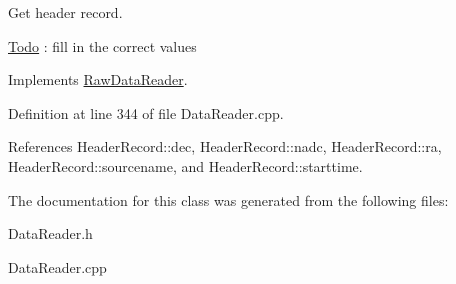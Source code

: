 Get header record. 

\begin{Desc}
\item[\hyperlink{todo__todo000008}{Todo}]: fill in the correct values \end{Desc}


Implements \hyperlink{classRawDataReader}{RawDataReader}.



Definition at line 344 of file DataReader.cpp.



References HeaderRecord::dec, HeaderRecord::nadc, HeaderRecord::ra, HeaderRecord::sourcename, and HeaderRecord::starttime.



The documentation for this class was generated from the following files:\begin{DoxyCompactItemize}
\item 
DataReader.h\item 
DataReader.cpp\end{DoxyCompactItemize}
